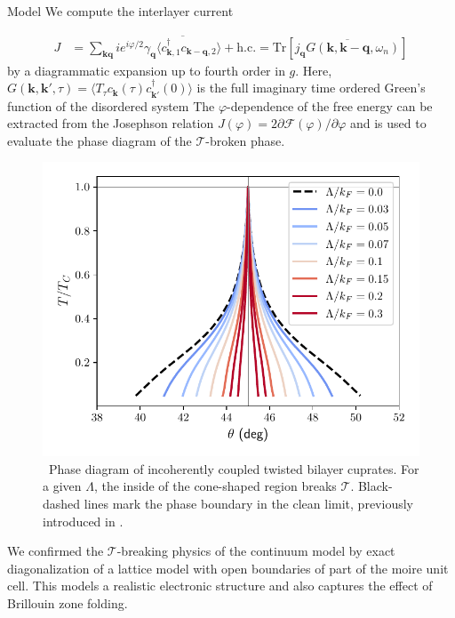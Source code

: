 \documentclass[final]{beamer}
\newlength{\onecolwid}
\begin{document}
\begin{frame}[t]
\begin{columns}[t]
\begin{column}{\onecolwid}
\begin{block}{Model}
We compute the interlayer current

\begin{align}
	J &= \sum_{\mathbf{kq}} i e^{i\varphi/2}\overline{\gamma_\mathbf{q}
	\langle c_{\mathbf{k},1}^\dagger c_{\mathbf{k-q},2} \rangle} + \textrm{h.c.} 
	\nonumber
	= \text{Tr}
	\left[ \overline{
		j_\mathbf{q} G(\mathbf{k},\mathbf{k-q},\omega_n)}
	\right]
	\label{eq:current}
\end{align}
by a diagrammatic expansion up to fourth order in $g$. 
Here, $G(\mathbf{k},\mathbf{k'},\tau)=\langle T_\tau c_{\mathbf{k}}(\tau) c_{\mathbf{k'}}^\dagger(0) \rangle$ is the full imaginary time ordered Green's function of the disordered system
The $\varphi$-dependence
of the free energy can 
be extracted from the Josephson relation
$J(\varphi)=2\partial \mathcal{F}(\varphi)/\partial \varphi$ and is used to
evaluate the phase diagram of the $\mathcal{T}$-broken phase.


\begin{figure}[t]
	\centering
	\includegraphics[width=\columnwidth]{fig/phase-diagram.pdf}
	\caption{\sffamily \, Phase diagram of incoherently coupled twisted bilayer cuprates. For a given $\Lambda$, the inside of the cone-shaped region breaks $\mathcal{T}$. Black-dashed lines mark the phase boundary in the clean limit, previously introduced in \cite{Can2021}.}
	\label{fig:phasediagram}
\end{figure}


We confirmed the $\mathcal{T}$-breaking physics of the continuum model by exact
diagonalization of a lattice model with open boundaries of
part of the moire unit cell. This models a realistic electronic structure and 
also captures the effect of Brillouin zone folding.


\end{block}
\end{column}
\end{columns}
\end{frame}
\end{document}
